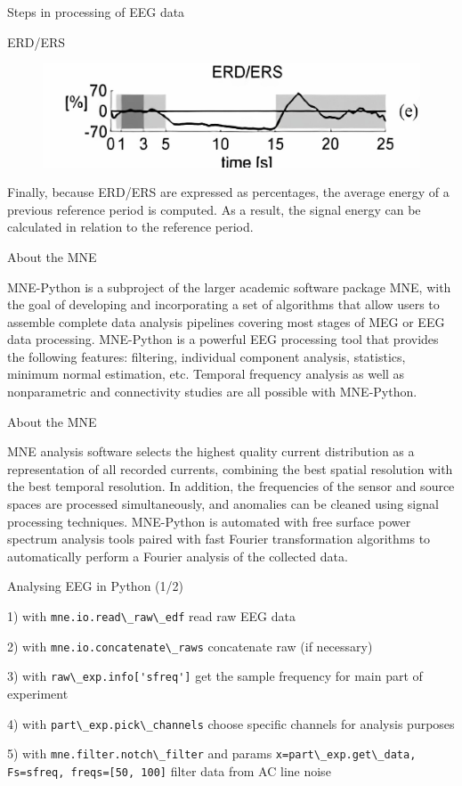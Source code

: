\documentclass{beamer}
\begin{document}
\begin{frame}
{\centerline{Steps in processing of EEG data}}
{\centerline{ERD/ERS}}
    \begin{figure}
        \centering
        \includegraphics[width=\linewidth]{P2023.AIBCCSS.BrainSignals/ERD.jpg}
    \end{figure}
    Finally, because ERD/ERS are expressed as percentages, the average energy of a previous reference period is computed. As a result, the signal energy can be calculated in relation to the reference period.
\end{frame}

\begin{frame}
{\centerline{About the MNE}}
    MNE-Python is a subproject of the larger academic software package MNE, with the goal of developing and incorporating a set of algorithms that allow users to assemble complete data analysis pipelines covering most stages of MEG or EEG data processing. MNE-Python is a powerful EEG processing tool that provides the following features: filtering, individual component analysis, statistics, minimum normal estimation, etc. Temporal frequency analysis as well as nonparametric and connectivity studies are all possible with MNE-Python.
\end{frame}

\begin{frame}
{\centerline{About the MNE}}
    MNE analysis software selects the highest quality current distribution as a representation of all recorded currents, combining the best spatial resolution with the best temporal resolution. In addition, the frequencies of the sensor and source spaces are processed simultaneously, and anomalies can be cleaned using signal processing techniques. MNE-Python is automated with free surface power spectrum analysis tools paired with fast Fourier transformation algorithms to automatically perform a Fourier analysis of the collected data.
\end{frame}

\begin{frame}
{\centerline{Analysing EEG in Python (1/2)}}

1) with \verb|mne.io.read\_raw\_edf| read raw EEG data

2) with \verb|mne.io.concatenate\_raws| concatenate raw (if necessary)

3) with \verb|raw\_exp.info['sfreq']| get the sample frequency for main part of experiment

4) with \verb|part\_exp.pick\_channels| choose specific channels for analysis purposes

5) with \verb|mne.filter.notch\_filter| and params \verb|x=part\_exp.get\_data, Fs=sfreq, freqs=[50, 100]| filter data from AC line noise
    
\end{frame}
\end{document}
